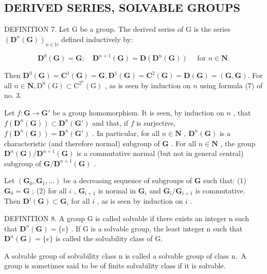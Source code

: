 \subsection{DERIVED SERIES, SOLVABLE GROUPS}

DEFINITION 7. Let G be a group. The derived series of G is the series \((\mathbf{D}^n (\mathbf{G}))_{n\in \mathbb{N}}\) defined inductively by:

\[
\mathbf {D} ^ {0} (\mathbf {G}) = \mathbf {G}; \quad \mathbf {D} ^ {n + 1} (\mathbf {G}) = \mathbf {D} (\mathbf {D} ^ {n} (\mathbf {G})) \quad \text { for } n \in \mathbf {N}.
\]

Then \(\mathbf{D}^0 (\mathbf{G}) = \mathbf{C}^1 (\mathbf{G}) = \mathbf{G},\mathbf{D}^1 (\mathbf{G}) = \mathbf{C}^2 (\mathbf{G}) = \mathbf{D}(\mathbf{G}) = (\mathbf{G},\mathbf{G}).\) For all \(n \in \mathbf{N}, \mathrm{D}^n(\mathrm{G}) \subset \mathrm{C}^{2^n}(\mathrm{G})\) , as is seen by induction on \(n\) using formula (7) of no. 3.

Let \(f: \mathbf{G} \to \mathbf{G}'\) be a group homomorphism. It is seen, by induction on \(n\) , that \(f(\mathbf{D}^n(\mathbf{G})) \subset \mathbf{D}^n(\mathbf{G}')\) and that, if \(f\) is surjective, \(f(\mathbf{D}^n(\mathbf{G})) = \mathbf{D}^n(\mathbf{G}')\) . In particular, for all \(n \in \mathbf{N}\) , \(\mathbf{D}^n(\mathbf{G})\) is a characteristic (and therefore normal) subgroup of \(\mathbf{G}\) . For all \(n \in \mathbf{N}\) , the group \(\mathbf{D}^n(\mathbf{G}) / \mathbf{D}^{n+1}(\mathbf{G})\) is a commutative normal (but not in general central) subgroup of \(\mathbf{G} / \mathbf{D}^{n+1}(\mathbf{G})\) .

Let \((\mathbf{G}_0, \mathbf{G}_1, \ldots)\) be a decreasing sequence of subgroups of \(\mathbf{G}\) such that: (1) \(\mathbf{G}_0 = \mathbf{G}\) ; (2) for all \(i\) , \(\mathbf{G}_{i+1}\) is normal in \(\mathbf{G}_i\) and \(\mathbf{G}_i / \mathbf{G}_{i+1}\) is commutative. Then \(\mathbf{D}^i(\mathbf{G}) \subset \mathbf{G}_i\) for all \(i\) , as is seen by induction on \(i\) .

DEFINITION 8. A group G is called solvable if there exists an integer n such that \(\mathbf{D}^{n}(\mathbf{G})=\{e\}\) . If G is a solvable group, the least integer n such that \(\mathbf{D}^{n}(\mathbf{G})=\{e\}\) is called the solvability class of G.

A solvable group of solvability class n is called a solvable group of class n.~A group is sometimes said to be of finite solvability class if it is solvable.

